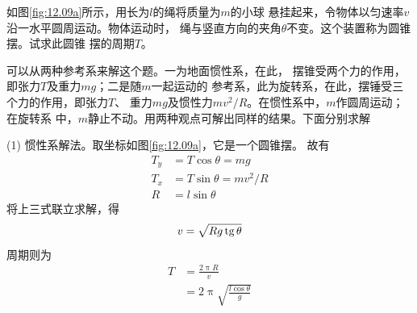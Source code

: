\example 如图\ref{fig:12.09a}所示，用长为$ l $的绳将质量为$ m $的小球
悬挂起来，令物体以匀速率$ v $沿一水平圆周运动。物体运动时，
绳与竖直方向的夹角$ \theta $不变。这个装置称为圆锥摆。试求此圆锥
摆的周期$ T $。

\begin{figure}[h]
  \centering
  \qquad
  \caption{}
  \label{fig:12.09}
\end{figure}

\solution 可以从两种参考系来解这个题。一为地面惯性系，在此，
摆锥受两个力的作用，即张力$ T $及重力$ mg $；二是随$ m $一起运动的
参考系，此为旋转系，在此，摆锤受三个力的作用，即张力$ T $、
重力$ mg $及惯性力$ mv^2/R $。在惯性系中，$ m $作圆周运动；在旋转系
中，$ m $静止不动。用两种观点可解出同样的结果。下面分别求解

(1) 惯性系解法。取坐标如图\ref{fig:12.09a}，它是一个圆锥摆。
故有
\begin{align*}
  T _ { y } & = T \cos \theta = m g             \\
  T _ { x } & = T \sin \theta = m v ^ { 2 } / R \\
  R         & = l \sin \theta
\end{align*}
将上三式联立求解，得
\begin{equation*}
  v = \sqrt { R g \operatorname{tg} \theta }
\end{equation*}
周期则为
\begin{align*}
  T & = \frac { 2 \uppi R } { v }                     \\
    & = 2 \uppi \sqrt{ \frac { l \cos \theta } { g }}
\end{align*}

